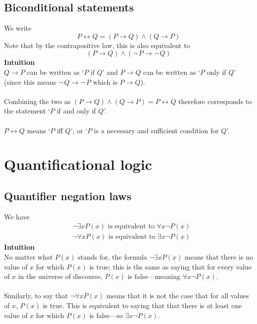 \documentclass{report}
\theoremstyle{definition}
\begin{document}
\subsection{Biconditional statements}
We write
\begin{equation*}
P\leftrightarrow Q=(P\to Q)\land(Q\to P)
\end{equation*}
Note that by the contrapositive law, this is also equivalent to
\begin{equation*}
(P\to Q)\land(\neg\,P\to\neg\,Q)
\end{equation*}
\textbf{Intuition}\\
$Q\to P$ can be written as `$P$ if $Q$' and $P\to Q$ can be written as `$P$ only if $Q$' (since this means $\neg\,Q\to\neg\,P$ which is $P\to Q$).\\
\vspace{1mm}\\
Combining the two as $(P\to Q)\land(Q\to P)=P\leftrightarrow Q$ therefore corresponds to the statement 
`$P$ if and only if $Q$'.\\
\vspace{1mm}\\
$P\leftrightarrow Q$ means `$P$ iff $Q$', or `$P$ is a necessary and sufficient condition for $Q$'.
\newpage

\section{Quantificational logic}
\subsection{Quantifier negation laws}
We have
\begin{align*}
&\neg\exists xP(x)\text{ is equivalent to }\forall x\neg P(x)\\
&\neg\forall xP(x)\text{ is equivalent to }\exists x\neg P(x)
\end{align*}
\textbf{Intuition}\\
No matter what $P(x)$ stands for, the formula $\neg\exists xP(x)$ means that there is no value of $x$ for which $P(x)$ is true; this is ths same as saying that for every value of $x$ in 
the universe of discourse, $P(x)$ is false---meaning $\forall x\neg P(x)$.\\
\vspace{1mm}\\
Similarly, to say that $\neg\forall xP(x)$ means that it is not the case that for all values of $x$, $P(x)$ is true. This is equivalent to saying that that there is at least one
value of $x$ for which $P(x)$ is false---so $\exists x\neg P(x)$.
\end{document}
